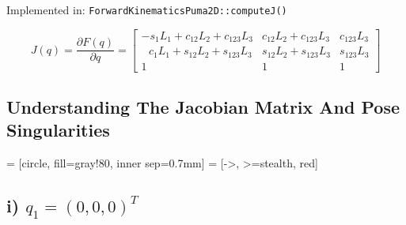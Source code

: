 \documentclass[a4paper,10pt]{article}
\begin{document}
\vspace{-6mm}Implemented in: \texttt{ForwardKinematicsPuma2D::computeJ()}

$$
J(q) = \dfrac{\partial F(q)}{\partial q} = 
\begin{bmatrix}
-s_1L_1+c_{12}L_2+c_{123}L_3 & c_{12}L_2+c_{123}L_3 & c_{123}L_3 \\
~~~c_1L_1 + s_{12}L_2 + s_{123}L_3 & s_{12}L_2 + s_{123}L_3 & s_{123}L_3\\
1 & 1 & 1
\end{bmatrix} 
$$


\subsection{Understanding The Jacobian Matrix And Pose Singularities}

 = [circle, fill=gray!80, inner sep=0.7mm]
 = [->, >=stealth, red]

\subsection*{i) $q_1 = (0, 0, 0)^T$}
\end{document}
